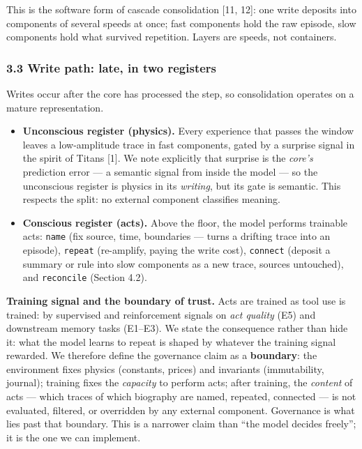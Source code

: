 \documentclass[
]{article}
\providecommand{\tightlist}{%
  \setlength{\itemsep}{0pt}\setlength{\parskip}{0pt}}
\begin{document}
This is the software form of cascade consolidation {[}11, 12{]}: one
write deposits into components of several speeds at once; fast
components hold the raw episode, slow components hold what survived
repetition. Layers are speeds, not containers.

\subsubsection{3.3 Write path: late, in two
registers}\label{write-path-late-in-two-registers}

Writes occur after the core has processed the step, so consolidation
operates on a mature representation.

\begin{itemize}
\tightlist
\item
  \textbf{Unconscious register (physics).} Every experience that passes
  the window leaves a low-amplitude trace in fast components, gated by a
  surprise signal in the spirit of Titans {[}1{]}. We note explicitly
  that surprise is the \emph{core's} prediction error --- a semantic
  signal from inside the model --- so the unconscious register is
  physics in its \emph{writing}, but its gate is semantic. This respects
  the split: no external component classifies meaning.
\item
  \textbf{Conscious register (acts).} Above the floor, the model
  performs trainable acts: \texttt{name} (fix source, time, boundaries
  --- turns a drifting trace into an episode), \texttt{repeat}
  (re-amplify, paying the write cost), \texttt{connect} (deposit a
  summary or rule into slow components as a new trace, sources
  untouched), and \texttt{reconcile} (Section 4.2).
\end{itemize}

\textbf{Training signal and the boundary of trust.} Acts are trained as
tool use is trained: by supervised and reinforcement signals on
\emph{act quality} (E5) and downstream memory tasks (E1--E3). We state
the consequence rather than hide it: what the model learns to repeat is
shaped by whatever the training signal rewarded. We therefore define the
governance claim as a \textbf{boundary}: the environment fixes physics
(constants, prices) and invariants (immutability, journal); training
fixes the \emph{capacity} to perform acts; after training, the
\emph{content} of acts --- which traces of which biography are named,
repeated, connected --- is not evaluated, filtered, or overridden by any
external component. Governance is what lies past that boundary. This is
a narrower claim than ``the model decides freely''; it is the one we can
implement.
\end{document}
